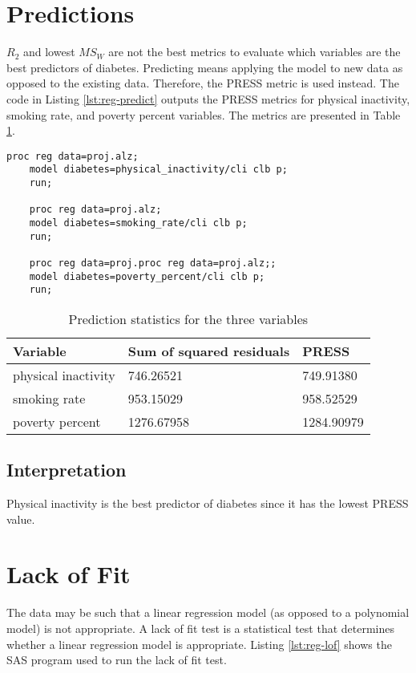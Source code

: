 \documentclass{article}
\begin{document}
\clearpage

\section{Predictions}
$R_2$ and lowest $MS_W$ are not the best metrics to evaluate which variables are the best predictors of diabetes. Predicting means applying the model to new data as opposed to the existing data. Therefore, the PRESS metric is used instead. The code in Listing \ref{lst:reg-predict} outputs the PRESS metrics for physical inactivity, smoking rate, and poverty percent variables. The metrics are presented in Table \ref{tab:prediction}.

\begin{lstlisting}[language=SAS,caption=Linear regression SAS program for additional variables,captionpos=b,label=lst:reg-predict]
    proc reg data=proj.alz;
    model diabetes=physical_inactivity/cli clb p;
    run;
    
    proc reg data=proj.alz;
    model diabetes=smoking_rate/cli clb p;
    run;
    
    proc reg data=proj.proc reg data=proj.alz;;
    model diabetes=poverty_percent/cli clb p;
    run;
\end{lstlisting}

\begin{table}[ht]
    \centering
    \begin{tabular}{|l|l|l|}
    \hline
         Variable & Sum of squared residuals  & PRESS \\
         \hline
         physical inactivity& 746.26521  & 749.91380 \\
         \hline
         smoking rate & 	953.15029  & 958.52529 \\
         \hline
         poverty percent & 1276.67958  & 1284.90979 \\
         \hline
    \end{tabular}
    \caption{Prediction statistics for the three variables}
    \label{tab:prediction}
\end{table}

\subsection{Interpretation}
Physical inactivity is the best predictor of diabetes since it has the lowest PRESS value.

\clearpage

\section{Lack of Fit}
The data may be such that a linear regression model (as opposed to a polynomial model) is not appropriate. A lack of fit test is a statistical test that determines whether a linear regression model is appropriate. Listing \ref{lst:reg-lof} shows the SAS program used to run the lack of fit test.
\end{document}
